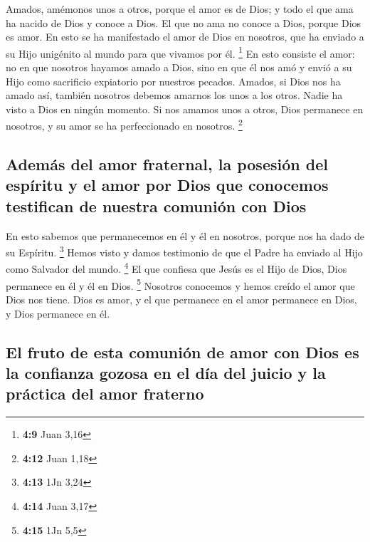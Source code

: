 \begin{paracol}{2}
 Amados, amémonos unos a otros, porque el amor es de Dios;
y todo el que ama ha nacido de Dios y conoce a Dios.  El
que no ama no conoce a Dios, porque Dios es amor.  En esto
se ha manifestado el amor de Dios en nosotros, que ha enviado a su Hijo
unigénito al mundo para que vivamos por él. \footnote{\textbf{4:9} Juan
  3,16}  En esto consiste el amor: no en que nosotros
hayamos amado a Dios, sino en que él nos amó y envió a su Hijo como
sacrificio expiatorio por nuestros pecados.  Amados, si
Dios nos ha amado así, también nosotros debemos amarnos los unos a los
otros.  Nadie ha visto a Dios en ningún momento. Si nos
amamos unos a otros, Dios permanece en nosotros, y su amor se ha
perfeccionado en nosotros. \footnote{\textbf{4:12} Juan 1,18}

\hypertarget{ademuxe1s-del-amor-fraternal-la-posesiuxf3n-del-espuxedritu-y-el-amor-por-dios-que-conocemos-testifican-de-nuestra-comuniuxf3n-con-dios}{%
\subsection{Además del amor fraternal, la posesión del espíritu y el
amor por Dios que conocemos testifican de nuestra comunión con
Dios}\label{ademuxe1s-del-amor-fraternal-la-posesiuxf3n-del-espuxedritu-y-el-amor-por-dios-que-conocemos-testifican-de-nuestra-comuniuxf3n-con-dios}}

 En esto sabemos que permanecemos en él y él en nosotros,
porque nos ha dado de su Espíritu. \footnote{\textbf{4:13} 1Jn 3,24}
 Hemos visto y damos testimonio de que el Padre ha
enviado al Hijo como Salvador del mundo. \footnote{\textbf{4:14} Juan
  3,17}  El que confiesa que Jesús es el Hijo de Dios,
Dios permanece en él y él en Dios. \footnote{\textbf{4:15} 1Jn 5,5}
 Nosotros conocemos y hemos creído el amor que Dios nos
tiene. Dios es amor, y el que permanece en el amor permanece en Dios, y
Dios permanece en él.

\hypertarget{el-fruto-de-esta-comuniuxf3n-de-amor-con-dios-es-la-confianza-gozosa-en-el-duxeda-del-juicio-y-la-pruxe1ctica-del-amor-fraterno}{%
\subsection{El fruto de esta comunión de amor con Dios es la confianza
gozosa en el día del juicio y la práctica del amor
fraterno}\label{el-fruto-de-esta-comuniuxf3n-de-amor-con-dios-es-la-confianza-gozosa-en-el-duxeda-del-juicio-y-la-pruxe1ctica-del-amor-fraterno}}


\end{paracol}
